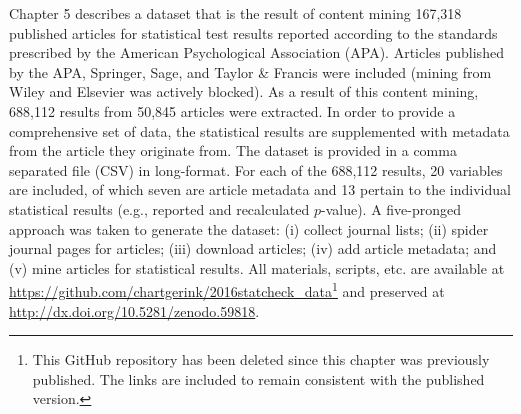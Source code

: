 \documentclass[a5paper]{book}
\let\rmarkdownfootnote\footnote%
\def\footnote{\protect\rmarkdownfootnote}
\begin{document}
Chapter 5 describes a dataset that is the result of content mining
167,318 published articles for statistical test results reported
according to the standards prescribed by the American Psychological
Association (APA). Articles published by the APA, Springer, Sage, and
Taylor \& Francis were included (mining from Wiley and Elsevier was
actively blocked). As a result of this content mining, 688,112 results
from 50,845 articles were extracted. In order to provide a comprehensive
set of data, the statistical results are supplemented with metadata from
the article they originate from. The dataset is provided in a comma
separated file (CSV) in long-format. For each of the 688,112 results, 20
variables are included, of which seven are article metadata and 13
pertain to the individual statistical results (e.g., reported and
recalculated \(p\)-value). A five-pronged approach was taken to generate
the dataset: (i) collect journal lists; (ii) spider journal pages for
articles; (iii) download articles; (iv) add article metadata; and (v)
mine articles for statistical results. All materials, scripts, etc. are
available at
\url{https://github.com/chartgerink/2016statcheck_data}\footnote{This
  GitHub repository has been deleted since this chapter was previously
  published. The links are included to remain consistent with the
  published version.} and preserved at
\href{http://doi.org/10.5281/zenodo.59818}{http://dx.doi.org/10.5281/zenodo.59818}.
\end{document}

